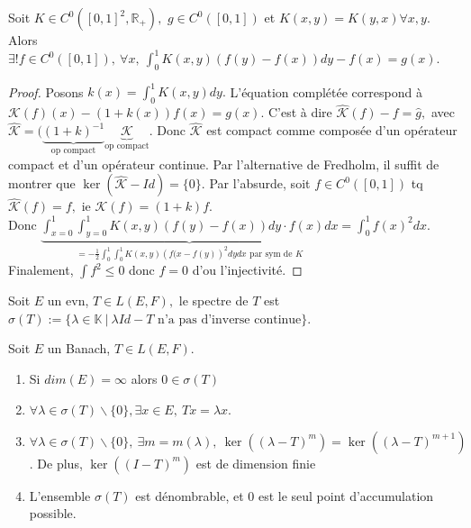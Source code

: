 \begin{corollaire}
    Soit $K\in C^0([0,1]^2,\mathbb{R}_+ ),$ $g\in C^0([0,1])$ et $K(x,y)=K(y,x)\forall x,y.  $  Alors $\exists !f\in C^0([0,1]),\ \forall x,\ \int_{0}^{1} K(x,y)\left( f(y)-f(x) \right) dy-f(x)=g(x).  $
\end{corollaire}
\begin{proof}
    Posons $k(x)=\int_{0}^{1} K(x,y)dy .$ L'équation complétée correspond à $\mathcal{K}(f)(x)-(1+k(x))f(x)=g(x).$ C'est à dire $\hat{\mathcal{K}}(f)-f=\hat{g},$ avec $\hat{\mathcal{K}}=(\underbrace{\left( 1+k \right) ^{-1} }_{\text{op compact}}\underbrace{\mathcal{K}}_{\text{op compact}}.$ Donc $\hat{\mathcal{K}}$ est compact comme composée d'un opérateur compact et d'un opérateur continue. Par l'alternative de Fredholm, il suffit de montrer que $\ker(\hat{\mathcal{K}}-Id)=\{0\} .$ Par l'absurde, soit $f\in C^0([0,1])$ tq $\hat{\mathcal{K}}(f)=f,$ ie $\mathcal{K}(f)=(1+k)f.$ \\
    Donc $\underbrace{\int_{x=0}^{1} \int_{y=0}^{1} K(x,y)\left( f(y)-f(x) \right) dy \cdot f(x)dx}_{=-\frac{1}{2}\int_{0}^{1} \int_{0}^{1} K(x,y)\left( f(x-f(y) \right) ^2dydx \text{ par sym de }K } =\int_0^1 f(x)^2dx $.\\
    Finalement, $\int f^2\le 0$ donc $f=0$ d'ou l'injectivité.
\end{proof}
\begin{definition}
    Soit $E$ un evn, $T\in L(E,F),$ le spectre de $T$ est $\sigma(T):=\{\lambda\in \mathbb{K}\ |\ \lambda Id-T \text{ n'a pas d'inverse continue}\} $.
\end{definition}
\begin{propriete}
    Soit $E$ un Banach, $T\in L(E,F).$
    \begin{enumerate}[label=(\roman*)]
        \item Si $dim(E)=\infty $ alors $0\in \sigma(T)$
        \item $\forall \lambda\in \sigma(T)\backslash \{0\}, \exists x\in E,\ Tx=\lambda x. $
        \item $\forall \lambda \in  \sigma(T)\backslash \{0\} ,\ \exists m=m(\lambda),\ \ker(\left( \lambda -T \right) ^m)=\ker\left( (\lambda-T)^{m+1} \right)  $. De plus, $\ker\left( (I-T)^m \right) $ est de dimension finie
        \item L'ensemble $\sigma(T)$ est dénombrable, et $0$ est le seul point d'accumulation possible.
    \end{enumerate}

\end{propriete}
